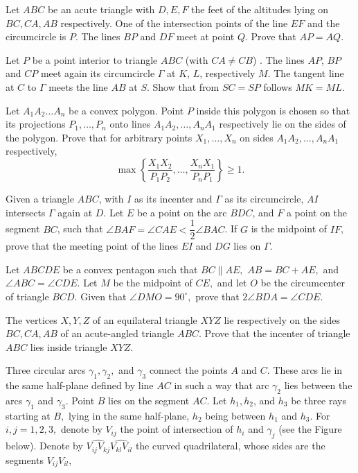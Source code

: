 \item[\textbf{G1.}]
Let 
$ABC$
 be an acute triangle with 
$D, E, F$
 the feet of the altitudes lying on 
$BC, CA, AB$
 respectively. One of the intersection points of the line 
$EF$
 and the circumcircle is 
$P.$
 The lines 
$BP$
 and 
$DF$
 meet at point 
$Q.$
 Prove that 
$AP = AQ.$

\item[\textbf{G2.}]
Let 
$P$
 be a point interior to triangle 
$ABC$
 (with 
$CA \neq CB$)
. The lines 
$AP$, 
$BP$
 and 
$CP$
 meet again its circumcircle 
$\Gamma$
 at 
$K$, 
$L$, 
 respectively 
$M$.
 The tangent line at 
$C$
 to 
$\Gamma$
 meets the line 
$AB$
 at 
$S$.
 Show that from 
$SC = SP$
 follows 
$MK = ML$.

\item[\textbf{G3.}]
Let 
$A_1A_2 \ldots A_n$
 be a convex polygon. Point 
$P$
 inside this polygon is chosen so that its projections 
$P_1, \ldots , P_n$
 onto lines 
$A_1A_2, \ldots , A_nA_1$
 respectively lie on the sides of the polygon. Prove that for arbitrary points 
$X_1, \ldots , X_n$
 on sides 
$A_1A_2, \ldots , A_nA_1$
 respectively,
\[\max \left\{ \frac{X_1X_2}{P_1P_2}, \ldots, \frac{X_nX_1}{P_nP_1} \right\} \geq 1.\]

\item[\textbf{G4.}]
Given a triangle 
$ABC$, 
 with 
$I$
 as its incenter and 
$\Gamma$
 as its circumcircle, 
$AI$
 intersects 
$\Gamma$
 again at 
$D$.
 Let 
$E$
 be a point on the arc 
$BDC$, 
 and 
$F$
 a point on the segment 
$BC$, 
 such that 
$\angle BAF=\angle CAE < \dfrac12\angle BAC$.
 If 
$G$
 is the midpoint of 
$IF$, 
 prove that the meeting point of the lines 
$EI$
 and 
$DG$
 lies on 
$\Gamma$.

\item[\textbf{G5.}]
Let 
$ABCDE$
 be a convex pentagon such that 
$BC \parallel AE,$
$AB = BC +  AE,$
 and 
$\angle ABC = \angle CDE.$
 Let 
$M$
 be the midpoint of 
$CE,$
 and let 
$O$
 be the circumcenter of triangle 
$BCD.$
 Given that 
$\angle DMO = 90^{\circ},$
 prove that 
$2 \angle BDA = \angle CDE.$

\item[\textbf{G6.}]
The vertices 
$X, Y , Z$
 of an equilateral triangle 
$XYZ$
 lie respectively on the sides 
$BC, CA, AB$
 of an acute-angled triangle 
$ABC.$
 Prove that the incenter of triangle 
$ABC$
 lies inside triangle 
$XYZ.$

\item[\textbf{G7.}]
Three circular arcs 
$\gamma_1, \gamma_2,$
 and 
$\gamma_3$
 connect the points 
$A$
 and 
$C.$
 These arcs lie in the same half-plane defined by line 
$AC$
 in such a way that arc 
$\gamma_2$
 lies between the arcs 
$\gamma_1$
 and 
$\gamma_3.$
 Point 
$B$
 lies on the segment 
$AC.$
 Let 
$h_1, h_2$, 
 and 
$h_3$
 be three rays starting at 
$B,$
 lying in the same half-plane, 
$h_2$
 being between 
$h_1$
 and 
$h_3.$
 For 
$i, j = 1, 2, 3,$
 denote by 
$V_{ij}$
 the point of intersection of 
$h_i$
 and 
$\gamma_j$
 (see the Figure below). Denote by 
$\widehat{V_{ij}V_{kj}}\widehat{V_{kl}V_{il}}$
 the curved quadrilateral, whose sides are the segments 
$V_{ij}V_{il},$
 
